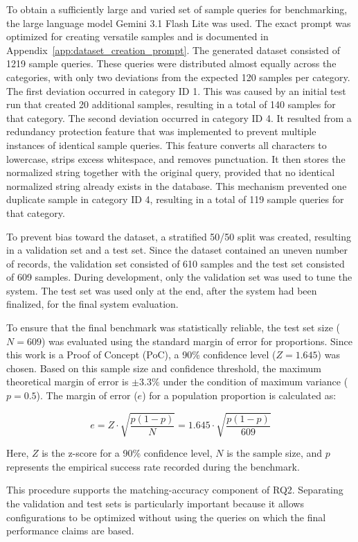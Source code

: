 To obtain a sufficiently large and varied set of sample queries for benchmarking, the large language model Gemini 3.1 Flash Lite was used. The exact prompt was optimized for creating versatile samples and is documented in Appendix~\ref{app:dataset_creation_prompt}. The generated dataset consisted of 1219 sample queries. These queries were distributed almost equally across the categories, with only two deviations from the expected 120 samples per category.
The first deviation occurred in category ID 1. This was caused by an initial test run that created 20 additional samples, resulting in a total of 140 samples for that category. The second deviation occurred in category ID 4. It resulted from a redundancy protection feature that was implemented to prevent multiple instances of identical sample queries. This feature converts all characters to lowercase, strips excess whitespace, and removes punctuation. It then stores the normalized string together with the original query, provided that no identical normalized string already exists in the database. This mechanism prevented one duplicate sample in category ID 4, resulting in a total of 119 sample queries for that category.

To prevent bias toward the dataset, a stratified 50/50 split was created, resulting in a validation set and a test set. Since the dataset contained an uneven number of records, the validation set consisted of 610 samples and the test set consisted of 609 samples. During development, only the validation set was used to tune the system. The test set was used only at the end, after the system had been finalized, for the final system evaluation.

To ensure that the final benchmark was statistically reliable, the test set size ($N = 609$) was evaluated using the standard margin of error for proportions. Since this work is a Proof of Concept (PoC), a 90\% confidence level ($Z = 1.645$) was chosen. Based on this sample size and confidence threshold, the maximum theoretical margin of error is $\pm3.3\%$ under the condition of maximum variance ($p = 0.5$). The margin of error ($e$) for a population proportion is calculated as:


$$e = Z \cdot \sqrt{\frac{p(1-p)}{N}} = 1.645 \cdot \sqrt{\frac{p(1-p)}{609}}$$

Here, $Z$ is the z-score for a 90\% confidence level, $N$ is the sample size, and $p$ represents the empirical success rate recorded during the benchmark.

This procedure supports the matching-accuracy component of RQ2. Separating the validation and test sets is particularly important because it allows configurations to be optimized without using the queries on which the final performance claims are based.

